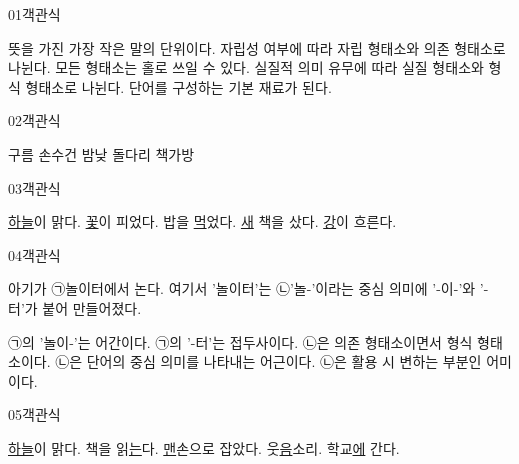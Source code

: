 \documentclass[fs9,seriesRus]{korfarm-base}
\begin{document}

\par\medskip
\kfBeginMC
\begin{kfQBlock}{01}{객관식}
\begin{kfChoices}
\kfChoice 뜻을 가진 가장 작은 말의 단위이다.
\kfChoice 자립성 여부에 따라 자립 형태소와 의존 형태소로 나뉜다.
\kfChoice 모든 형태소는 홀로 쓰일 수 있다.
\kfChoice 실질적 의미 유무에 따라 실질 형태소와 형식 형태소로 나뉜다.
\kfChoice 단어를 구성하는 기본 재료가 된다.
\end{kfChoices}
\end{kfQBlock}
\begin{kfQBlock}{02}{객관식}
\begin{kfChoices}
\kfChoice 구름
\kfChoice 손수건
\kfChoice 밤낮
\kfChoice 돌다리
\kfChoice 책가방
\end{kfChoices}
\end{kfQBlock}
\begin{kfQBlock}{03}{객관식}
\begin{kfChoices}
\kfChoice \uline{하늘}이 맑다.
\kfChoice \uline{꽃}이 피었다.
\kfChoice 밥을 \uline{먹}었다.
\kfChoice \uline{새} 책을 샀다.
\kfChoice \uline{강}이 흐른다.
\end{kfChoices}
\end{kfQBlock}
\begin{kfQBlock}{04}{객관식}
\begin{kfEvidence}아기가 ㉠놀이터에서 논다. 여기서 '놀이터'는 ㉡'놀-'이라는 중심 의미에 '-이-'와 '-터'가 붙어 만들어졌다.\end{kfEvidence}
\begin{kfChoices}
\kfChoice ㉠의 '놀이-'는 어간이다.
\kfChoice ㉠의 '-터'는 접두사이다.
\kfChoice ㉡은 의존 형태소이면서 형식 형태소이다.
\kfChoice ㉡은 단어의 중심 의미를 나타내는 어근이다.
\kfChoice ㉡은 활용 시 변하는 부분인 어미이다.
\end{kfChoices}
\end{kfQBlock}
\begin{kfQBlock}{05}{객관식}
\begin{kfChoices}
\kfChoice \uline{하늘}이 맑다.
\kfChoice 책을 읽\uline{는}다.
\kfChoice \uline{맨}손으로 잡았다.
\kfChoice 웃\uline{음}소리.
\kfChoice 학교\uline{에} 간다.
\end{kfChoices}
\end{kfQBlock}
\end{document}
